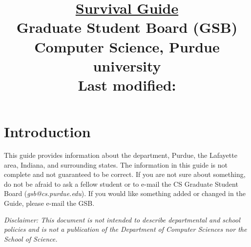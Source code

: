 \documentclass[letterpaper,10pt]{article}
\begin{document}
\date{}

\title{\huge \underline{Survival Guide} \\
Graduate Student Board (GSB) \\
Computer Science, Purdue university \\
\vspace{\baselineskip}
\large Last modified: \filemodprintdate{\jobname}}

\maketitle

\section{Introduction}
This guide provides information about the department, Purdue, the Lafayette area, Indiana, and surrounding states. The information in this guide is not complete and not guaranteed to be correct. If you are not sure about something, do not be afraid to ask a fellow student or to e-mail the CS Graduate Student Board (\emph{gsb@cs.purdue.edu}). If you would like something added or changed in the Guide, please e-mail the GSB.

\textit{Disclaimer: This document is not intended to describe departmental and school policies and is not a publication of the Department of Computer Sciences nor the School of Science.}

\tableofcontents


























\end{document}
